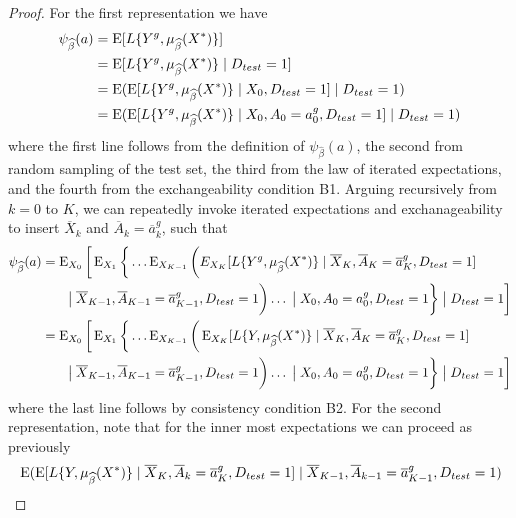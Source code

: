 \begin{proof}
    For the first representation we have 
    \begin{align*}
        \psi_{\widehat{\beta}}(a) &= \operatorname{E}[L\{Y^{g}, \mu_{\widehat{\beta}}(X^*)\}] \\
        & = \operatorname{E}[L\{Y^{g}, \mu_{\widehat{\beta}}(X^*)\}\mid D_{test} = 1] \\
        & = \operatorname{E}(\operatorname{E}[L\{Y^{g}, \mu_{\widehat{\beta}}(X^*)\}\mid X_0, D_{test} = 1] \mid D_{test} = 1) \\
        & = \operatorname{E}(\operatorname{E}[L\{Y^{g}, \mu_{\widehat{\beta}}(X^*)\}\mid X_0, A_0 = a^g_0, D_{test} = 1] \mid D_{test} = 1) 
    \end{align*}
    where the first line follows from the definition of $\psi_{\widehat{\beta}}(a)$, the second from random sampling of the test set, the third from the law of iterated expectations, and the fourth from the exchangeability condition B1. Arguing recursively from $k = 0$ to $K$, we can repeatedly invoke iterated expectations and exchanageability to insert $\overline{X}_k$ and $\overline{A}_k = \overline{a}^g_k$, such that
    \begin{align*}
        \psi_{\widehat{\beta}}(a) &= \operatorname{E}_{X_0}\bigg[\operatorname{E}_{X_1}\bigg\{\ldots \operatorname{E}_{X_{K-1}}\bigg(E_{X_{K}}[L\{Y^g, \mu_{\widehat{\beta}}(X^*)\} \mid \overline{X}_K, \overline{A}_K=\overline{a}^g_K, D_{test} = 1] \\
        & \qquad \big\vert\; \overline{X}_{K-1}, \overline{A}_{K-1}=\overline{a}^g_{K-1}, D_{test} = 1\bigg) \ldots \;\big\vert\; X_{0}, A_{0}=a^g_{0}, D_{test} = 1\bigg\}\;\big\vert\; D_{test} = 1\bigg]\\
        &= \operatorname{E}_{X_0}\bigg[\operatorname{E}_{X_1}\bigg\{\ldots \operatorname{E}_{X_{K-1}}\bigg(\operatorname{E}_{X_{K}}[L\{Y, \mu_{\widehat{\beta}}(X^*)\} \mid \overline{X}_K, \overline{A}_K=\overline{a}^g_K, D_{test} = 1] \\
        & \qquad \big\vert\; \overline{X}_{K-1}, \overline{A}_{K-1}=\overline{a}^g_{K-1}, D_{test} = 1\bigg) \ldots \;\big\vert\; X_{0}, A_{0}=a^g_{0}, D_{test} = 1\bigg\}\;\big\vert\; D_{test} = 1\bigg]
    \end{align*}
    where the last line follows by consistency condition B2. For the second representation, note that for the inner most expectations we can proceed as previously
    \begin{align*}
        & \E(\E[L\{Y, \mu_{\widehat{\beta}}(X^*)\} \mid \overline{X}_K, \overline{A}_k=\overline{a}^g_K, D_{test} = 1] \mid \overline{X}_{K-1}, \overline{A}_{k-1}=\overline{a}^g_{K-1}, D_{test} = 1) \\

\end{align*}
\end{proof}
